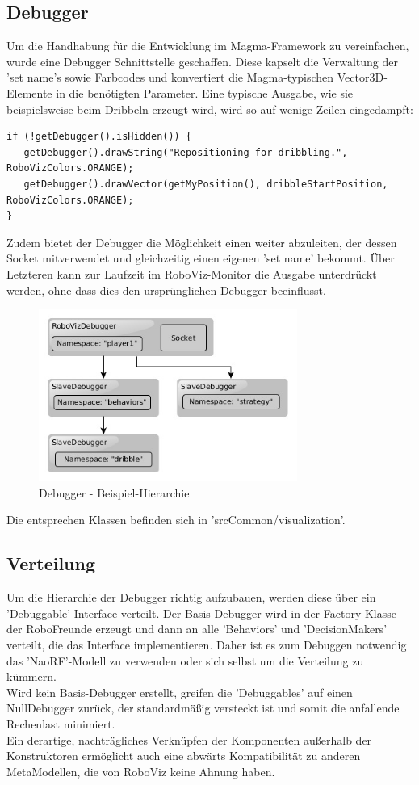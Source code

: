 \subsection{Debugger}
\label{subsec:Debugger}
Um die Handhabung für die Entwicklung im Magma-Framework zu vereinfachen, wurde eine Debugger Schnittstelle geschaffen. Diese kapselt die Verwaltung der 'set name's sowie Farbcodes und konvertiert die Magma-typischen Vector3D-Elemente in die benötigten Parameter. Eine typische Ausgabe, wie sie beispielsweise beim Dribbeln erzeugt wird, wird so auf wenige Zeilen eingedampft:
\begin{lstlisting}[caption=RoboVizDebugger, captionpos=b, label=lst:Debug]
if (!getDebugger().isHidden()) {
   getDebugger().drawString("Repositioning for dribbling.", RoboVizColors.ORANGE);
   getDebugger().drawVector(getMyPosition(), dribbleStartPosition, RoboVizColors.ORANGE);
}
\end{lstlisting}

Zudem bietet der Debugger die Möglichkeit einen weiter abzuleiten, der dessen Socket mitverwendet und gleichzeitig einen eigenen 'set name' bekommt. Über Letzteren kann zur Laufzeit im RoboViz-Monitor die Ausgabe unterdrückt werden, ohne dass dies den ursprünglichen Debugger beeinflusst.

\begin{figure}[H]
	\centering
	\includegraphics[width=240pt]{Grafiken/RoboViz/Debugger}
	\caption{Debugger - Beispiel-Hierarchie}
	\label{fig:debugger-hierarchy}
\end{figure}

Die entsprechen Klassen befinden sich in 'srcCommon/visualization'.

\subsection{Verteilung}
\label{subsec:Debugger Verteilung}
Um die Hierarchie der Debugger richtig aufzubauen, werden diese über ein 'Debuggable' Interface verteilt. Der Basis-Debugger wird in der Factory-Klasse der RoboFreunde erzeugt und dann an alle 'Behaviors' und 'DecisionMakers' verteilt, die das Interface implementieren. Daher ist es zum Debuggen notwendig das 'NaoRF'-Modell zu verwenden oder sich selbst um die Verteilung zu kümmern.\\
Wird kein Basis-Debugger erstellt, greifen die 'Debuggables' auf einen NullDebugger zurück, der standardmäßig versteckt ist und somit die anfallende Rechenlast minimiert.\\
Ein derartige, nachträgliches Verknüpfen der Komponenten außerhalb der Konstruktoren ermöglicht auch eine abwärts Kompatibilität zu anderen MetaModellen, die von RoboViz keine Ahnung haben.

